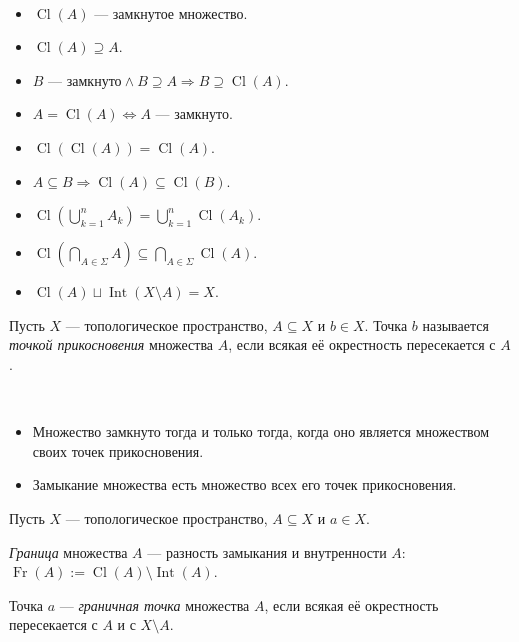 \documentclass[12pt,a4paper]{article}
\DeclareMathOperator{\Int}{Int}
\DeclareMathOperator{\Cl}{Cl}
\DeclareMathOperator{\Fr}{Fr}
\begin{document}
    \begin{theorem}\ 
        \begin{itemize}
            \item $\Cl(A)$ --- замкнутое множество.
            \item $\Cl(A) \supseteq A$.
            \item $B\text{ --- замкнуто} \wedge B \supseteq A \Rightarrow B \supseteq \Cl(A)$.
            \item $A = \Cl(A) \Leftrightarrow A \text{ --- замкнуто}$.
            \item $\Cl(\Cl(A)) = \Cl(A)$.
            \item $A \subseteq B \Rightarrow \Cl(A) \subseteq \Cl(B)$.
            \item $\Cl(\bigcup_{k=1}^n A_k) = \bigcup_{k=1}^n \Cl(A_k)$.
            \item $\Cl(\bigcap_{A \in \Sigma} A) \subseteq \bigcap_{A \in \Sigma} \Cl(A)$.
            \item $\Cl(A) \sqcup \Int(X \setminus A) = X$.
        \end{itemize}
    \end{theorem}

    \begin{definition}
        Пусть $X$ --- топологическое пространство, $A \subseteq X$ и $b \in X$. Точка $b$ называется \emph{точкой прикосновения} множества $A$, если всякая её окрестность пересекается с $A$.
    \end{definition}

    \begin{theorem}\ 
        \begin{itemize}
            \item Множество замкнуто тогда и только тогда, когда оно является множеством своих точек прикосновения.
            \item Замыкание множества есть множество всех его точек прикосновения.
        \end{itemize}
    \end{theorem}

    \begin{definition}
        Пусть $X$ --- топологическое пространство, $A \subseteq X$ и $a \in X$.

        \emph{Граница} множества $A$ --- разность замыкания и внутренности $A$: $\Fr(A) := \Cl(A) \setminus \Int(A)$.

        Точка $a$ --- \emph{граничная точка} множества $A$, если всякая её окрестность пересекается с $A$ и с $X \setminus A$.
    \end{definition}
\end{document}
